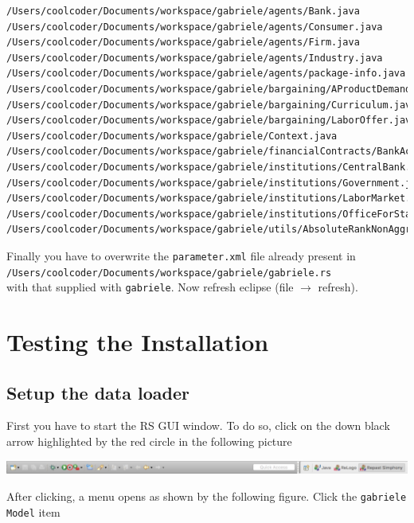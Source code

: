 \documentclass{book}
\begin{document}
\begin{verbatim}
/Users/coolcoder/Documents/workspace/gabriele/agents/Bank.java
/Users/coolcoder/Documents/workspace/gabriele/agents/Consumer.java
/Users/coolcoder/Documents/workspace/gabriele/agents/Firm.java
/Users/coolcoder/Documents/workspace/gabriele/agents/Industry.java
/Users/coolcoder/Documents/workspace/gabriele/agents/package-info.java
/Users/coolcoder/Documents/workspace/gabriele/bargaining/AProductDemand.java
/Users/coolcoder/Documents/workspace/gabriele/bargaining/Curriculum.java
/Users/coolcoder/Documents/workspace/gabriele/bargaining/LaborOffer.java
/Users/coolcoder/Documents/workspace/gabriele/Context.java
/Users/coolcoder/Documents/workspace/gabriele/financialContracts/BankAccount.java
/Users/coolcoder/Documents/workspace/gabriele/institutions/CentralBank.java
/Users/coolcoder/Documents/workspace/gabriele/institutions/Government.java
/Users/coolcoder/Documents/workspace/gabriele/institutions/LaborMarket.java
/Users/coolcoder/Documents/workspace/gabriele/institutions/OfficeForStatistics.java
/Users/coolcoder/Documents/workspace/gabriele/utils/AbsoluteRankNonAggregateDataSource.java
\end{verbatim}

Finally you have to overwrite the \verb+parameter.xml+ file already present in\\  
\verb+/Users/coolcoder/Documents/workspace/gabriele/gabriele.rs+\\
with that supplied with \verb+gabriele+.
\fi
Now refresh eclipse (file $\rightarrow$ refresh).



\section{Testing the Installation}
\subsection{Setup the data loader}


First you have to start the RS GUI window. To do so, click on the down black arrow highlighted by the red circle in the following picture

\noindent
\includegraphics[scale=0.35]{fig_gabriele_rs_execution1}

After clicking, a menu opens as shown by the following figure. Click the \verb+gabriele Model+ item
\end{document}
